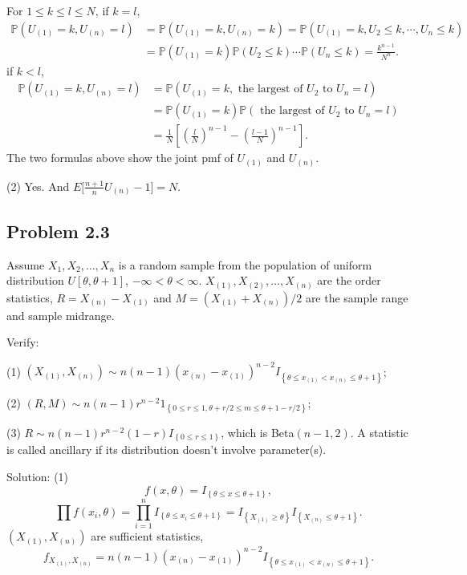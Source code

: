 For $1\leq k\leq l\leq N$, if $k=l$,
\begin{align*}
\mathbb{P}\left(U_{(1)}=k,U_{(n)}=l\right)&=\mathbb{P}\left(U_{(1)}=k,U_{(n)}=k\right)=\mathbb{P}\left(U_{(1)}=k,U_{2}\leq k,\cdots,U_{n}\leq k\right)\\
&=\mathbb{P}\left(U_{(1)}=k\right)\mathbb{P}\left(U_{2}\leq k\right)\cdots\mathbb{P}\left(U_{n}\leq k\right)=\frac{k^{n-1}}{N^{n}}.
\end{align*}
if $k<l$,
\begin{align*}\mathbb{P}\left(U_{(1)}=k,U_{(n)}=l\right)&=\mathbb{P}\left(U_{(1)}=k,\text{ the largest of }U_{2}\text{ to }U_{n}=l\right)\\
&=\mathbb{P}\left(U_{(1)}=k\right)\mathbb{P}\left(\text{ the largest of }U_{2}\text{ to }U_{n}=l\right)\\
&=\frac{1}{N}\left[\left(\frac{l}{N}\right)^{n-1}-\left(\frac{l-1}{N}\right)^{n-1}\right].
\end{align*}
The two formulas above show the joint pmf of $U_{(1)}$ and $U_{(n)}$.

(2) Yes. And $E\big[\frac{n+1}{n}U_{(n)}-1\big]=N$.

\subsection*{Problem 2.3}
Assume $X_{1},X_{2},\ldots,X_{n}$ is a random sample from the population of uniform distribution $U[\theta,\theta+1]$, $-\infty<\theta<\infty$. $X_{(1)},X_{(2)},\ldots,X_{(n)}$ are the order statistics, $R=X_{(n)}-X_{(1)}$ and $M=\left(X_{(1)}+X_{(n)}\right)/2$ are the sample range and sample midrange.

Verify:

(1) $\left(X_{(1)},X_{(n)}\right)\sim n(n-1)\left(x_{(n)}-x_{(1)}\right)^{n-2}I_{\left\{\theta\leq x_{(1)}<x_{(n)}\leq\theta+1\right\}}$;

(2) $\left(R,M\right)\sim n(n-1)r^{n-2}1_{\left\{0\leq r\leq 1,\theta+r/2\leq m\leq\theta+1-r/2\right\}}$;

(3) $R\sim n(n-1)r^{n-2}(1-r)I_{\left\{0\leq r\leq 1\right\}}$, which is Beta$(n-1,2)$. A statistic is called ancillary if its distribution doesn't involve parameter(s).

{Solution:}
(1)
\[
f\left(x,\theta\right)=I_{\left\{\theta\leq x\leq\theta+1\right\}},
\]
\[
\prod f\left(x_{i},\theta\right)=\prod_{i=1}^{n}I_{\left\{\theta\leq x_{i}\leq\theta+1\right\}}=I_{\left\{X_{(1)}\geq\theta\right\}}I_{\left\{X_{(n)}\leq\theta+1\right\}}.
\]
$\left(X_{(1)},X_{(n)}\right)$ are sufficient statistics,
\[
f_{X_{(1)},X_{(n)}}=n(n-1)\left(x_{(n)}-x_{(1)}\right)^{n-2}I_{\left\{\theta\leq x_{(1)}<x_{(n)}\leq\theta+1\right\}}.
\]


